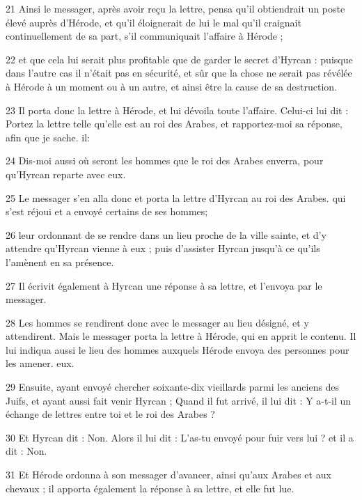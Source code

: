 \par 21 Ainsi le messager, après avoir reçu la lettre, pensa qu'il obtiendrait un poste élevé auprès d'Hérode, et qu'il éloignerait de lui le mal qu'il craignait continuellement de sa part, s'il communiquait l'affaire à Hérode ;

\par 22 et que cela lui serait plus profitable que de garder le secret d'Hyrcan : puisque dans l'autre cas il n'était pas en sécurité, et sûr que la chose ne serait pas révélée à Hérode à un moment ou à un autre, et ainsi être la cause de sa destruction.

\par 23 Il porta donc la lettre à Hérode, et lui dévoila toute l'affaire. Celui-ci lui dit : Portez la lettre telle qu'elle est au roi des Arabes, et rapportez-moi sa réponse, afin que je sache. il:

\par 24 Dis-moi aussi où seront les hommes que le roi des Arabes enverra, pour qu'Hyrcan reparte avec eux.

\par 25 Le messager s'en alla donc et porta la lettre d'Hyrcan au roi des Arabes. qui s'est réjoui et a envoyé certains de ses hommes;

\par 26 leur ordonnant de se rendre dans un lieu proche de la ville sainte, et d'y attendre qu'Hyrcan vienne à eux ; puis d'assister Hyrcan jusqu'à ce qu'ils l'amènent en sa présence.

\par 27 Il écrivit également à Hyrcan une réponse à sa lettre, et l'envoya par le messager.

\par 28 Les hommes se rendirent donc avec le messager au lieu désigné, et y attendirent. Mais le messager porta la lettre à Hérode, qui en apprit le contenu. Il lui indiqua aussi le lieu des hommes auxquels Hérode envoya des personnes pour les amener. eux.

\par 29 Ensuite, ayant envoyé chercher soixante-dix vieillards parmi les anciens des Juifs, et ayant aussi fait venir Hyrcan ; Quand il fut arrivé, il lui dit : Y a-t-il un échange de lettres entre toi et le roi des Arabes ?

\par 30 Et Hyrcan dit : Non. Alors il lui dit : L'as-tu envoyé pour fuir vers lui ? et il a dit : Non.

\par 31 Et Hérode ordonna à son messager d'avancer, ainsi qu'aux Arabes et aux chevaux ; il apporta également la réponse à sa lettre, et elle fut lue.

